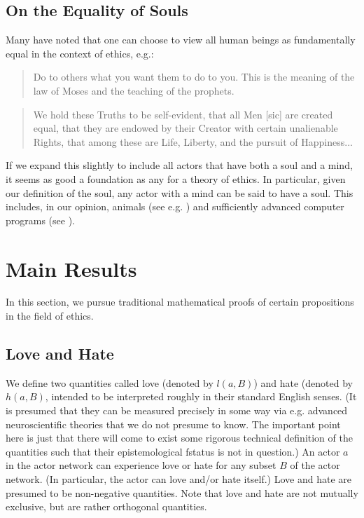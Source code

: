 \documentclass{article}
\begin{document}
\subsection{On the Equality of Souls}

Many have noted that one can choose to view all human beings as
fundamentally equal in the context of ethics, e.g.:

\begin{quote}
  Do to others what you want them to do to you. This is the meaning of
  the law of Moses and the teaching of the prophets. \cite{mount}
\end{quote}

\begin{quote}
  We hold these Truths to be self-evident, that all Men [sic] are
  created equal, that they are endowed by their Creator with certain
  unalienable Rights, that among these are Life, Liberty, and the
  pursuit of Happiness... \cite{independence}
\end{quote}

If we expand this slightly to include all actors that have both a soul
and a mind, it seems as good a foundation as any for a theory of
ethics. In particular, given our definition of the soul, any actor
with a mind can be said to have a soul. This includes, in our opinion,
animals (see e.g. \cite{singer1995animal, coetzee1999lives}) and
sufficiently advanced computer programs (see
\cite{turing1954computing}).

\section{Main Results}

In this section, we pursue traditional mathematical proofs of certain
propositions in the field of ethics.

\subsection{Love and Hate}

We define two quantities called love (denoted by $l(a, B)$) and hate
(denoted by $h(a, B)$, intended to be interpreted roughly in their
standard English senses. (It is presumed that they can be measured
precisely in some way via e.g. advanced neuroscientific theories that
we do not presume to know. The important point here is just that there
will come to exist some rigorous technical definition of the
quantities such that their epistemological fstatus is not in
question.) An actor $a$ in the actor network can experience love or
hate for any subset $B$ of the actor network. (In particular, the
actor can love and/or hate itself.) Love and hate are presumed to be
non-negative quantities. Note that love and hate are not mutually
exclusive, but are rather orthogonal quantities.
\end{document}
